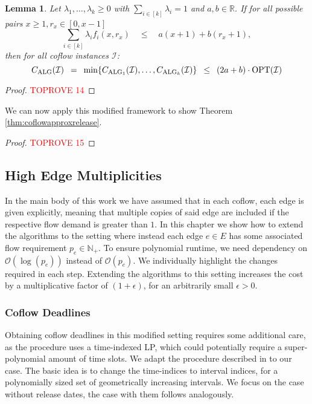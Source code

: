 \documentclass[11pt]{article}
\newcommand{\Hquad}{\hspace{0.5em}}
\newtheorem{lemma}[theorem]{Lemma}
\begin{document}
\begin{lemma}\label{lemma:appboundrelease}
Let $\lambda_1,\dotsc,\lambda_k \ge 0$ with $\sum_{i \in [k]}\lambda_i = 1$ and $a,b \in \mathbb{R}$. If for all possible pairs $x \ge 1, r_x \in [0,x-1]$
\begin{equation*}
    \sum_{i \in [k]}\lambda_i f_i(x, r_x) \quad \le \quad a(x+1) + b(r_x+1),
\end{equation*}
then for all coflow instances $\mathcal{I}$:
\begin{equation*}
    C_{\mathrm{ALG}}(\mathcal{I}) \Hquad=\Hquad \min\{C_{\mathrm{ALG}_1}(\mathcal{I}),\dotsc,C_{\mathrm{ALG}_k}(\mathcal{I})\} \Hquad\le\Hquad (2a + b) \cdot \mathrm{OPT}(\mathcal{I})
\end{equation*}
\end{lemma}
\begin{proof}\textcolor{red}{TOPROVE 14}\end{proof}
\noindent We can now apply this modified framework to show Theorem \ref{thm:coflowapproxrelease}.

\rsthmcoflowapproxrelease*
\begin{proof}\textcolor{red}{TOPROVE 15}\end{proof}


\subsection{High Edge Multiplicities}\label{sec:app:coflowpseudopoly}

In the main body of this work we have assumed that in each coflow, each edge is given explicitly, meaning that multiple copies of said edge are included if the respective flow demand is greater than $1$. In this chapter we show how to extend the algorithms to the setting where instead each edge $e\in E$ has some associated flow requirement $p_e \in \mathbb{N}_+$. To ensure polynomial runtime, we need dependency on $\mathcal{O}(\log(p_e))$ instead of $\mathcal{O}(p_e)$. We individually highlight the changes required in each step. Extending the algorithms to this setting increases the cost by a multiplicative factor of $(1+\epsilon)$, for an arbitrarily small $\epsilon > 0$.

\subsubsection*{Coflow Deadlines}

Obtaining coflow deadlines in this modified setting requires some additional care, as the procedure uses a time-indexed LP, which could potentially require a super-polynomial amount of time slots. We adapt the procedure described in \cite{im19} to our case. The basic idea is to change the time-indices to interval indices, for a polynomially sized set of geometrically increasing intervals. We focus on the case without release dates, the case with them follows analogously.\\
\end{document}
